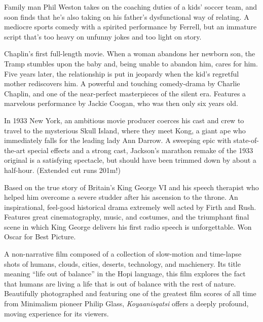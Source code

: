    Family man Phil Weston takes on the coaching duties of a kids' soccer team, and soon finds that he's also taking on his father's dysfunctional way of relating. A mediocre sports comedy with a spirited performance by Ferrell, but an immature script that's too heavy on unfunny jokes and too light on story. \author{DW} 

   Chaplin's first full-length movie. When a woman abandons her newborn son, the Tramp stumbles upon the baby and, being unable to abandon him, cares for him. Five years later, the relationship is put in jeopardy when the kid's regretful mother rediscovers him. A powerful and touching comedy-drama by Charlie Chaplin, and one of the near-perfect masterpieces of the silent era. Features a marvelous performance by Jackie Coogan, who was then only six years old. \author{AW}

   In 1933 New York, an ambitious movie producer coerces his cast and crew to travel to the mysterious Skull Island, where they meet Kong, a giant ape who immediately falls for the leading lady Ann Darrow. A sweeping epic with state-of-the-art special effects and a strong cast, Jackson's marathon remake of the 1933 original is a satisfying spectacle, but should have been trimmed down by about a half-hour. (Extended cut runs 201m!) \author{DW} 

   Based on the true story of Britain's King George VI and his speech therapist who helped him overcome a severe studder after his ascension to the throne. An inspirational, feel-good historical drama extremely well acted by Firth and Rush. Features great cinematography, music, and costumes, and the triumphant final scene in which King George delivers his first radio speech is unforgettable. Won Oscar for Best Picture. \author{DW} 

  A non-narrative film composed of a collection of slow-motion and time-lapse shots of humans, clouds, cities, deserts, technology, and machienery. Its title meaning ``life out of balance'' in the Hopi language, this film explores the fact that humans are living a life that is out of balance with the rest of nature. Beautifully photographed and featuring one of the greatest film scores of all time from Minimalism pioneer Philip Glass, \textit{Koyaanisqatsi} offers a deeply profound, moving experience for its viewers. \author{DW}
